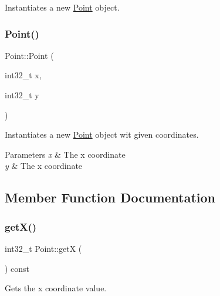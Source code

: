 Instantiates a new \mbox{\hyperlink{struct_point}{Point}} object. 

\mbox{\label{struct_point_ab6cb04aa3731364d1a6ea28e876b0eda}} 
\subsubsection{\texorpdfstring{Point()}{Point()}\hspace{0.1cm}{\footnotesize\ttfamily [2/2]}}
{\footnotesize\ttfamily Point\+::\+Point (\begin{DoxyParamCaption}\item[{int32\+\_\+t}]{x,  }\item[{int32\+\_\+t}]{y }\end{DoxyParamCaption})\hspace{0.3cm}{\ttfamily [inline]}}



Instantiates a new \mbox{\hyperlink{struct_point}{Point}} object wit given coordinates. 


\begin{DoxyParams}{Parameters}
{\em x} & The x coordinate\\
\hline
{\em y} & The x coordinate\\
\hline
\end{DoxyParams}


\subsection{Member Function Documentation}
\mbox{\label{struct_point_a46c064951bdb12e4cd3a53de22128367}} 
\subsubsection{\texorpdfstring{getX()}{getX()}}
{\footnotesize\ttfamily int32\+\_\+t Point\+::getX (\begin{DoxyParamCaption}{ }\end{DoxyParamCaption}) const\hspace{0.3cm}{\ttfamily [inline]}}



Gets the x coordinate value. 

\mbox{\label{struct_point_a9819e3077a2e0f7ecfd02aa5e50d7476}} 
